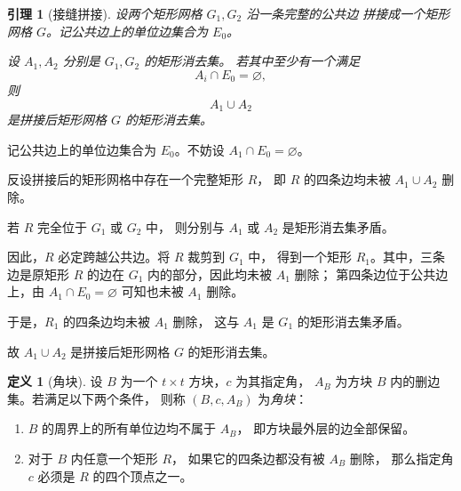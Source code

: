 \documentclass[UTF8,11pt,a4paper,fontset=none]{ctexart}
\makeatletter
\theoremstyle{plain}
\newtheorem{lemma}[theorem]{引理}
\theoremstyle{definition}
\newtheorem{definition}[theorem]{定义}
\renewcommand{\proofname}{证明}
\renewenvironment{proof}[1][\proofname]{\par
  \pushQED{\qed}%
  \normalfont
  \topsep6\p@\@plus6\p@\relax
  \trivlist
  \item[\hskip\labelsep
        \bfseries#1\@addpunct{.}]%
  \ignorespaces
}{%
  \popQED\endtrivlist\@endpefalse
}
\makeatother
\begin{document}
\begin{lemma}[接缝拼接]
设两个矩形网格 $G_1,G_2$ 沿一条完整的公共边
拼接成一个矩形网格 $G$。记公共边上的单位边集合为
$E_0$。

设 $A_1,A_2$ 分别是 $G_1,G_2$ 的矩形消去集。
若其中至少有一个满足
\[
A_i\cap E_0=\varnothing,
\]
则
\[
A_1\cup A_2
\]
是拼接后矩形网格 $G$ 的矩形消去集。
\end{lemma}

\begin{proof}
记公共边上的单位边集合为 $E_0$。不妨设
$A_1\cap E_0=\varnothing$。

反设拼接后的矩形网格中存在一个完整矩形 $R$，
即 $R$ 的四条边均未被 $A_1\cup A_2$ 删除。

若 $R$ 完全位于 $G_1$ 或 $G_2$ 中，
则分别与 $A_1$ 或 $A_2$ 是矩形消去集矛盾。

因此，$R$ 必定跨越公共边。将 $R$ 裁剪到 $G_1$ 中，
得到一个矩形 $R_1$。其中，三条边是原矩形 $R$
的边在 $G_1$ 内的部分，因此均未被 $A_1$ 删除；
第四条边位于公共边上，由
$A_1\cap E_0=\varnothing$ 可知也未被 $A_1$ 删除。

于是，$R_1$ 的四条边均未被 $A_1$ 删除，
这与 $A_1$ 是 $G_1$ 的矩形消去集矛盾。

故 $A_1\cup A_2$ 是拼接后矩形网格 $G$ 的矩形消去集。
\end{proof}

\begin{definition}[角块]
设 $B$ 为一个 $t\times t$ 方块，$c$ 为其指定角，
$A_B$ 为方块 $B$ 内的删边集。若满足以下两个条件，
则称 $(B,c,A_B)$ 为\emph{角块}：

\begin{enumerate}
    \item $B$ 的周界上的所有单位边均不属于 $A_B$，
    即方块最外层的边全部保留。

    \item 对于 $B$ 内任意一个矩形 $R$，
    如果它的四条边都没有被 $A_B$ 删除，
    那么指定角 $c$ 必须是 $R$ 的四个顶点之一。
\end{enumerate}
\label{def:corner-block}
\end{definition}
\end{document}
